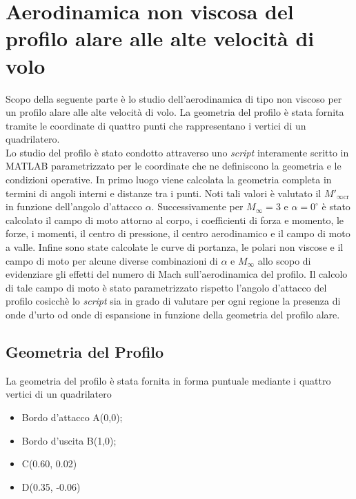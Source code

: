 \chapter{Aerodinamica non viscosa del profilo alare alle alte velocità di volo}
Scopo della seguente parte è lo studio dell'aerodinamica di tipo non viscoso per un profilo alare alle alte velocità di volo. La geometria del profilo è stata fornita tramite le coordinate di quattro punti che rappresentano i vertici di un quadrilatero.\\
Lo studio del profilo è stato condotto attraverso uno {\itshape script} interamente scritto in MATLAB parametrizzato per le coordinate che ne definiscono la geometria e le condizioni operative. In primo luogo viene calcolata la geometria completa in termini di angoli interni e distanze tra i punti. Noti tali valori è valutato il $M'_{\infty\mathrm{cr}}$ in funzione dell'angolo d'attacco $\alpha$. Successivamente per $M_{\infty}=3$ e $\alpha=0^{\circ}$ è stato calcolato il campo di moto attorno al corpo, i coefficienti di forza e momento, le forze, i momenti, il centro di pressione, il centro aerodinamico e il campo di moto a valle. Infine sono state calcolate le curve di portanza, le polari non viscose e il campo di moto per alcune diverse combinazioni di  $\alpha$ e $M_{\infty}$ allo scopo di evidenziare gli effetti del numero di Mach sull'aerodinamica del profilo.  Il calcolo di tale campo di moto è stato parametrizzato rispetto l'angolo d'attacco del profilo cosicchè lo {\itshape script} sia in grado di valutare per ogni regione la presenza di onde d'urto od onde di espansione in funzione della geometria del profilo alare.

\section{Geometria del Profilo}
La geometria del profilo è stata fornita in forma puntuale mediante i quattro vertici di un quadrilatero
\begin{itemize}
\item Bordo d'attacco A(0,0);
\item Bordo d'uscita B(1,0);
\item C(0.60, 0.02)
\item D(0.35, -0.06)
\end{itemize}

